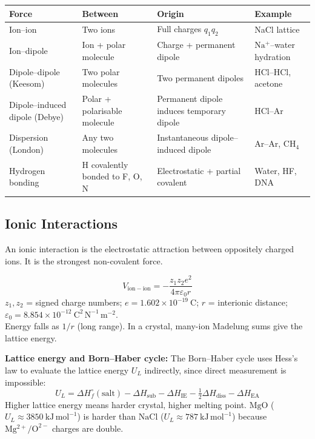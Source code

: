 \documentclass[12pt,a4paper]{article}
\begin{document}
\begin{tabularx}{\linewidth}{|B{2.8cm}|Y|Y|Y|}
\hline
\textbf{Force} & \textbf{Between} & \textbf{Origin} & \textbf{Example} \\
\hline
Ion--ion & Two ions & Full charges $q_1q_2$ & NaCl lattice \\
\hline
Ion--dipole & Ion + polar molecule & Charge + permanent dipole & $\mathrm{Na^+}$--water hydration \\
\hline
Dipole--dipole (Keesom) & Two polar molecules & Two permanent dipoles & HCl--HCl, acetone \\
\hline
Dipole--induced dipole (Debye) & Polar + polarisable molecule & Permanent dipole induces temporary dipole & HCl--Ar \\
\hline
Dispersion (London) & Any two molecules & Instantaneous dipole--induced dipole & Ar--Ar, $\mathrm{CH_4}$ \\
\hline
Hydrogen bonding & H covalently bonded to F, O, N & Electrostatic + partial covalent & Water, HF, DNA \\
\hline
\end{tabularx}

\subsection{Ionic Interactions}
An ionic interaction is the electrostatic attraction between oppositely charged ions. It is the strongest non-covalent force.

\begin{tcolorbox}[formulabox, title={Coulomb Potential Between Two Ions}]
\[
V_{\mathrm{ion-ion}}=-\frac{z_1 z_2 e^2}{4\pi\varepsilon_0 r}
\]
$z_1, z_2$ = signed charge numbers; $e=1.602\times10^{-19}\ \mathrm{C}$; $r$ = interionic distance; $\varepsilon_0=8.854\times10^{-12}\ \mathrm{C^2\,N^{-1}\,m^{-2}}$.\\[2pt]
Energy falls as $1/r$ (long range). In a crystal, many-ion Madelung sums give the lattice energy.
\end{tcolorbox}

\textbf{Lattice energy and Born--Haber cycle:} The Born--Haber cycle uses Hess's law to evaluate the lattice energy $U_L$ indirectly, since direct measurement is impossible:
\[
U_L = \Delta H_f^\circ(\mathrm{salt}) - \Delta H_{\mathrm{sub}} - \Delta H_{\mathrm{IE}} - \tfrac12 \Delta H_{\mathrm{diss}} - \Delta H_{\mathrm{EA}}
\]
Higher lattice energy means harder crystal, higher melting point. $\mathrm{MgO}$ ($U_L\approx3850\ \mathrm{kJ\,mol^{-1}}$) is harder than $\mathrm{NaCl}$ ($U_L\approx787\ \mathrm{kJ\,mol^{-1}}$) because $\mathrm{Mg^{2+}/O^{2-}}$ charges are double.
\end{document}
